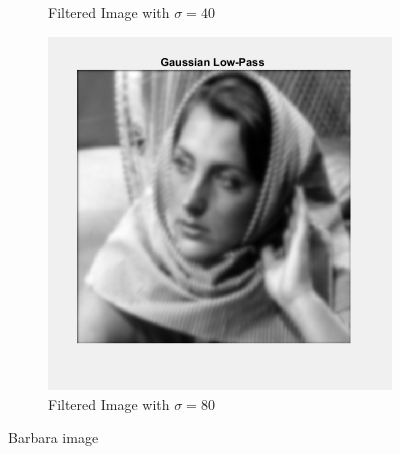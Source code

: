 \documentclass[a4paper]{article}
\begin{document}
\begin{figure}[h]
\begin{subfigure}{0.33\linewidth}
        \caption{Filtered Image with $ \sigma=40$}
    \end{subfigure}
    \begin{subfigure}{0.33\linewidth}
        \centering
        \includegraphics[width=\linewidth]{80_image.png}
        \caption{Filtered Image with $ \sigma=80$}
    \end{subfigure}
    \caption{Barbara image}
    \label{fig:bo}
\end{figure}
\end{document}
